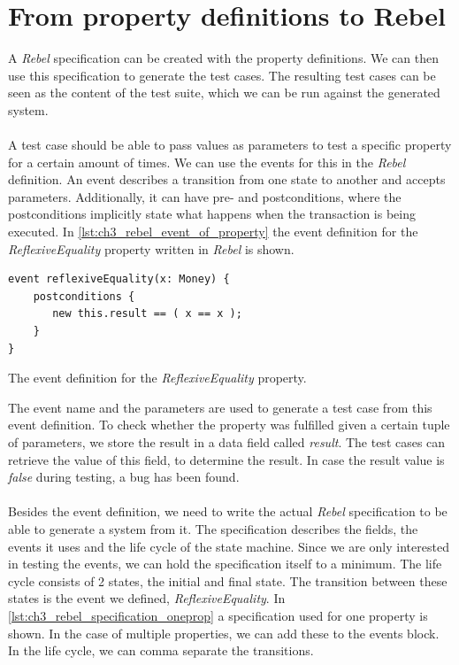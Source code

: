 \section{From property definitions to Rebel}
\label{sct:3_prop_to_rebel}
A \textit{Rebel} specification can be created with the property definitions. We can then use this specification to generate the test cases. The resulting test cases can be seen as the content of the test suite, which we can be run against the generated system.\\
\\
A test case should be able to pass values as parameters to test a specific property for a certain amount of times. We can use the events for this in the \textit{Rebel} definition. An event describes a transition from one state to another and accepts parameters. Additionally, it can have pre- and postconditions, where the postconditions implicitly state what happens when the transaction is being executed. In \autoref{lst:ch3_rebel_event_of_property} the event definition for the \textit{ReflexiveEquality} property written in \textit{Rebel} is shown.
\FloatBarrier
\begin{sourcecode}[h!]
\begin{lstlisting}[language=Rebel]
event reflexiveEquality(x: Money) {
    postconditions {
       new this.result == ( x == x );
    }
}
\end{lstlisting}
\caption{The event definition for the \textit{ReflexiveEquality} property.}
\label{lst:ch3_rebel_event_of_property}
\end{sourcecode}
\FloatBarrier
The event name and the parameters are used to generate a test case from this event definition. To check whether the property was fulfilled given a certain tuple of parameters, we store the result in a data field called \textit{result}. The test cases can retrieve the value of this field, to determine the result. In case the result value is \textit{false} during testing, a bug has been found.\\
\\
Besides the event definition, we need to write the actual \textit{Rebel} specification to be able to generate a system from it. The specification describes the fields, the events it uses and the life cycle of the state machine. Since we are only interested in testing the events, we can hold the specification itself to a minimum. The life cycle consists of 2 states, the initial and final state. The transition between these states is the event we defined, \textit{ReflexiveEquality}. In \autoref{lst:ch3_rebel_specification_oneprop} a specification used for one property is shown. In the case of multiple properties, we can add these to the events block. In the life cycle, we can comma separate the transitions.
